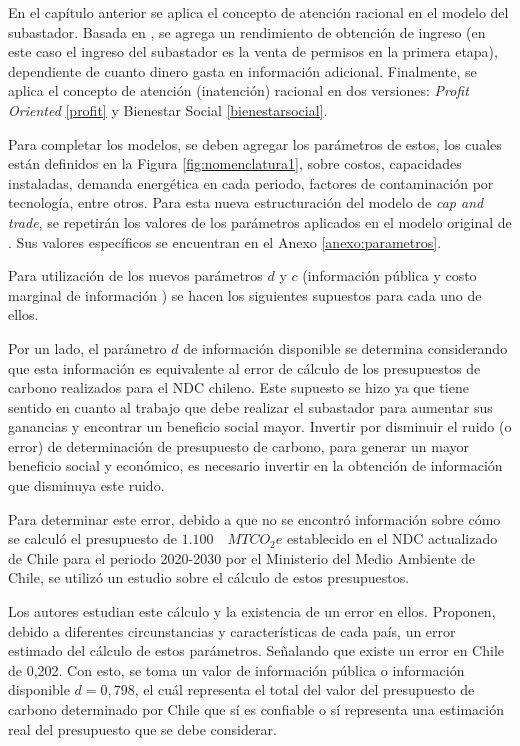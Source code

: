 En el capítulo anterior se aplica el concepto de atención racional en el modelo del subastador. Basada en \cite{dewan_estimating_2020}, se agrega un rendimiento de obtención de ingreso (en este caso el ingreso del subastador es la venta de permisos en la primera etapa), dependiente de cuanto dinero gasta en información adicional. Finalmente, se aplica el concepto de atención (inatención) racional en dos versiones: \textit{Profit Oriented} \ref{profit} y Bienestar Social \ref{bienestarsocial}. 
\vspace{2.5mm}

Para completar los modelos, se deben agregar los parámetros de estos, los cuales están definidos en la Figura \ref{fig:nomenclatura1}, sobre costos, capacidades instaladas, demanda energética en cada periodo, factores de contaminación por tecnología, entre otros. Para esta nueva estructuración del modelo de \textit{cap and trade}, se repetirán los valores de los parámetros aplicados en el modelo original de \cite{amigo_two_2021}. Sus valores específicos se encuentran en el Anexo \ref{anexo:parametros}.
\vspace{2.5mm}

Para utilización de los nuevos parámetros $d$ y $c$ (información pública y costo marginal de información ) se hacen los siguientes supuestos para cada uno de ellos.
\vspace{2.5mm}

Por un lado,  el parámetro $d$ de información disponible se determina considerando que esta información es equivalente al error de cálculo de los presupuestos de carbono realizados para el NDC chileno. Este supuesto se hizo ya que tiene sentido en cuanto al trabajo que debe realizar el subastador para aumentar sus ganancias y encontrar un beneficio social mayor. Invertir por disminuir el ruido (o error) de determinación de presupuesto de carbono, para generar un mayor beneficio social y económico, es necesario invertir en la obtención de información que disminuya este ruido. \vspace{2.5mm}

Para determinar este error, debido a que no se encontró información sobre cómo se calculó el presupuesto de $1.100\quad MTCO_{2}e$ establecido en el NDC actualizado de Chile para el periodo 2020-2030 por el Ministerio del Medio Ambiente de Chile, se utilizó un estudio sobre el cálculo de estos presupuestos.
\vspace{2.5mm}

Los autores  estudian este cálculo y la existencia de un error en ellos. Proponen, debido a diferentes circunstancias y características de cada país, un error estimado del cálculo de estos parámetros. Señalando que existe un error en Chile de 0,202. Con esto, se toma un valor de información pública o información disponible $d=0,798$, el cuál representa el total del valor del presupuesto de carbono determinado por Chile que sí es confiable o sí representa una estimación real del presupuesto que se debe considerar.   
\vspace{2.5mm}

